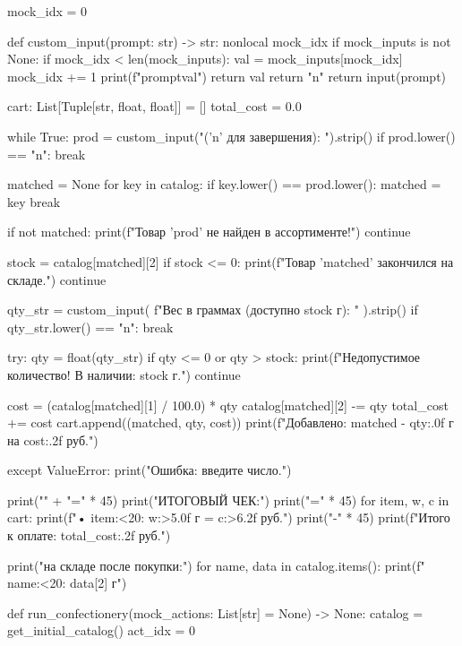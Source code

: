\documentclass[14pt,a4paper]{extarticle}
\begin{document}
\begin{CodeListing}
    mock_idx = 0

    def custom_input(prompt: str) -> str:
        nonlocal mock_idx
        if mock_inputs is not None:
            if mock_idx < len(mock_inputs):
                val = mock_inputs[mock_idx]
                mock_idx += 1
                print(f"{prompt}{val}")
                return val
            return "n"
        return input(prompt)

    cart: List[Tuple[str, float, float]] = []
    total_cost = 0.0

    while True:
        prod = custom_input(" ('n' для завершения): ").strip()
        if prod.lower() == "n":
            break

        matched = None
        for key in catalog:
            if key.lower() == prod.lower():
                matched = key
                break

        if not matched:
            print(f"Товар '{prod}' не найден в ассортименте!")
            continue

        stock = catalog[matched][2]
        if stock <= 0:
            print(f"Товар '{matched}' закончился на складе.")
            continue

        qty_str = custom_input(
            f"Вес в граммах (доступно {stock} г): "
        ).strip()
        if qty_str.lower() == "n":
            break

        try:
            qty = float(qty_str)
            if qty <= 0 or qty > stock:
                print(f"Недопустимое количество! В наличии: {stock} г.")
                continue

            cost = (catalog[matched][1] / 100.0) * qty
            catalog[matched][2] -= qty
            total_cost += cost
            cart.append((matched, qty, cost))
            print(f"Добавлено: {matched} - {qty:.0f} г на {cost:.2f} руб.")

        except ValueError:
            print("Ошибка: введите число.")

    print("\n" + "=" * 45)
    print("ИТОГОВЫЙ ЧЕК:")
    print("=" * 45)
    for item, w, c in cart:
        print(f"• {item:<20}: {w:>5.0f} г  = {c:>6.2f} руб.")
    print("-" * 45)
    print(f"Итого к оплате: {total_cost:.2f} руб.")

    print(" на складе после покупки:")
    for name, data in catalog.items():
        print(f"  {name:<20}: {data[2]} г")


def run_confectionery(mock_actions: List[str] = None) -> None:
    catalog = get_initial_catalog()
    act_idx = 0


\end{CodeListing}
\end{document}

